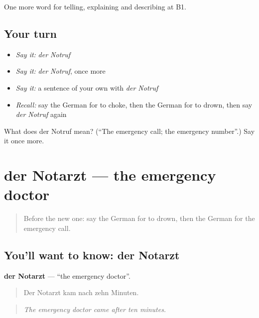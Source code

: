 \begin{grammarlens}[title={What you've built}]
One more word for telling, explaining and describing at B1.
\end{grammarlens}

\subsection*{Your turn}
\begin{itemize}
\raggedright
  \item \emph{Say it:} \emph{der Notruf}
  \item \emph{Say it:} \emph{der Notruf}, once more
  \item \emph{Say it:} a sentence of your own with \emph{der Notruf}
  \item \emph{Recall:} say the German for to choke, then the German for to drown, then say \emph{der Notruf} again
\end{itemize}

\begin{tcolorbox}[breakable,colback=teal!4,colframe=teal!35!black,title={Before you move on}]
What does der Notruf mean? (\textquotedblleft{}The emergency call; the emergency number\textquotedblright{}.) Say it once more.
\end{tcolorbox}
\section[der Notarzt]{der Notarzt — the emergency doctor}

\label{lesson:GE-C291-notarzt}



\begin{quote}
Before the new one: say the German for to drown, then the German for the emergency call.
\end{quote}

\subsection*{You'll want to know: der Notarzt}
\textbf{der Notarzt} — \textquotedblleft{}the emergency doctor\textquotedblright{}.

\begin{quote}
Der Notarzt kam nach zehn Minuten.
\end{quote}

\begin{quote}
\emph{The emergency doctor came after ten minutes.}
\end{quote}

